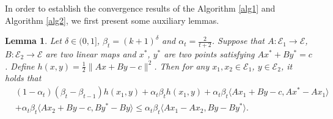 \documentclass{article}
\numberwithin{equation}{section}
\newtheorem{lemma}{Lemma}[section]
\begin{document}
In order to establish the convergence results of the Algorithm \ref{alg1} and Algorithm  \ref{alg2}, we first present some auxiliary lemmas.
\begin{lemma}   \label{lemma_of_h}
    Let $\delta \in (0,1]$, $\beta_t = (k+1)^{\delta}$ and $\alpha_t=\frac{2}{t+2}$. Suppose that  
    $A: \mathcal{E}_1\rightarrow \mathcal{E}$, $B: \mathcal{E}_2\rightarrow \mathcal{E}$ are two linear maps and $x^*$, $y^*$ are two points satisfying 
    $Ax^*+By^*=c$. Define $h(x,y)=\frac{1}{2}\|Ax+By-c\rVert^2$. Then for any $x_1, x_2\in \mathcal{E}_1$, $y\in\mathcal{E}_2$, it holds that
    \begin{align}
        &(1-\alpha_t)(\beta_{t}-\beta_{t-1})h(x_1,y) + \alpha_t\beta_{t}h(x_1,y) + \alpha_t\beta_{t}\langle Ax_1+By-c,Ax^*-Ax_1\rangle \nonumber \\
        &+ \alpha_t\beta_{t}\langle Ax_2 +By -c, By^* -By\rangle \leq \alpha_t\beta_t \langle Ax_1 -Ax_2, By-By^* \rangle. \nonumber 
    \end{align} 
\end{lemma}
\end{document}
